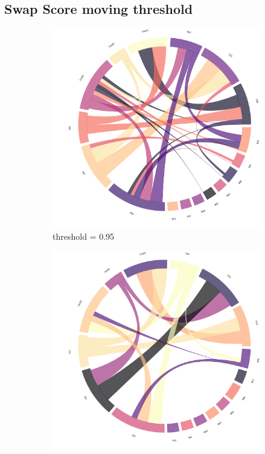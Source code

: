 \subsection{Swap Score moving threshold}
\begin{figure}[!ht]
	\centering
	\begin{subfigure}[b]{0.3\linewidth}
		\includegraphics[width=\linewidth]{figures/chords/chord_swap_Ensemble1000_RCN5333300_095.png}
		\caption{threshold = 0.95}
	\end{subfigure}
	\hfill
	\begin{subfigure}[b]{0.3\linewidth}
		\includegraphics[width=\linewidth]{figures/chords/chord_swap_Ensemble1000_RCN5333300_096.png}

\end{subfigure}
\end{figure}
